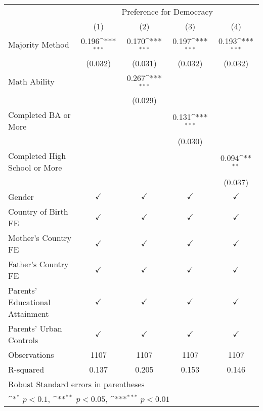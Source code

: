 \documentclass[]{article}
\begin{document}
\begin{table}
\begin{adjustbox}{width=\columnwidth,center}

{
\def\sym#1{\ifmmode^{#1}\else\(^{#1}\)\fi}
\begin{tabular}{l*{4}{c}}
\hline\hline
                &\multicolumn{4}{c}{Preference for Democracy}                               \\\cmidrule(lr){2-5}
                &\multicolumn{1}{c}{(1)}         &\multicolumn{1}{c}{(2)}         &\multicolumn{1}{c}{(3)}         &\multicolumn{1}{c}{(4)}         \\
\hline
Majority Method &    0.196\sym{***}&    0.170\sym{***}&    0.197\sym{***}&    0.193\sym{***}\\
                &  (0.032)         &  (0.031)         &  (0.032)         &  (0.032)         \\
[1em]
Math Ability    &                  &    0.267\sym{***}&                  &                  \\
                &                  &  (0.029)         &                  &                  \\
[1em]
Completed BA or More&                  &                  &    0.131\sym{***}&                  \\
                &                  &                  &  (0.030)         &                  \\
[1em]
Completed High School or More&                  &                  &                  &    0.094\sym{**} \\
                &                  &                  &                  &  (0.037)         \\
\hline
Gender          &$\checkmark$         &$\checkmark$         &$\checkmark$         &$\checkmark$         \\
Country of Birth FE&$\checkmark$         &$\checkmark$         &$\checkmark$         &$\checkmark$         \\
Mother's Country FE&$\checkmark$         &$\checkmark$         &$\checkmark$         &$\checkmark$         \\
Father's Country FE&$\checkmark$         &$\checkmark$         &$\checkmark$         &$\checkmark$         \\
Parents' Educational Attainment&$\checkmark$         &$\checkmark$         &$\checkmark$         &$\checkmark$         \\
Parents' Urban Controls&$\checkmark$         &$\checkmark$         &$\checkmark$         &$\checkmark$         \\
Observations    & 1107    & 1107 & 1107     & 1107    \\
R-squared       &    0.137         &    0.205         &    0.153         &    0.146         \\
\hline\hline
\multicolumn{5}{l}{\footnotesize Robust Standard errors in parentheses}\\
\multicolumn{5}{l}{\footnotesize \sym{*} \(p<0.1\), \sym{**} \(p<0.05\), \sym{***} \(p<0.01\)}\\
\end{tabular}
}




\end{adjustbox}
\end{table}
\end{document}
